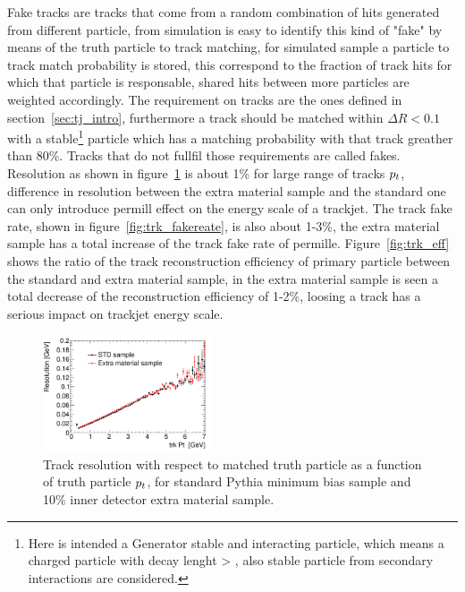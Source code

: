 Fake tracks are tracks that come from a random combination of hits generated from different particle, from simulation
is easy to identify this kind of "fake" by means of the truth particle to track matching, for simulated sample 
a particle to track match probability is stored, this correspond to the fraction of track hits for which that particle
is responsable, shared hits between more particles are weighted accordingly. The requirement on tracks are the ones defined 
in section~\ref{sec:tj_intro}, furthermore a track should be matched within $\Delta R <0.1$ with a 
stable\footnote{Here is intended a Generator stable and interacting particle, which means a charged particle with decay lenght > ,
also stable particle from secondary interactions are considered.} 
particle which has a matching probability with that track greather than 80\%. Tracks that do not fullfil
those requirements are called fakes. 
Resolution as shown in figure~\ref{fig:trk_reso} is about 1\% for large range of tracks $p_{t}$, difference in resolution between 
the extra material sample and the standard one can only introduce permill effect on the energy scale of a trackjet. 
The track fake rate, shown in figure~\ref{fig:trk_fakereate}, is also about 1-3\%, the extra material sample has 
a total increase of the track fake rate of permille. Figure~\ref{fig:trk_eff} shows the ratio of the track reconstruction
efficiency of primary particle between the standard and extra material sample, in the extra material sample is seen
a total decrease of the reconstruction efficiency of 1-2\%, loosing a track has a serious impact on trackjet energy scale.

\begin{figure}[tp]
\centering
\includegraphics[width=0.45\textwidth]{figure/trackjet/T7/trk_reso_updater.pdf}
\caption{Track resolution with respect to matched truth particle as a function of truth particle $p_{t}$, 
	for standard Pythia minimum bias sample and 10\% inner detector extra material sample.}

\label{fig:trk_reso}
\end{figure}    

